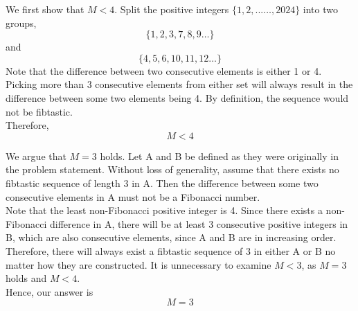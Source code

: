 \documentclass[11pt, letterpaper]{article}
\begin{document}
\begin{solution}{3}

We first show that $M < 4$. Split the positive integers $\{1,2,...\dotsc,2024\}$ into two groups, $$\{1,2,3,7,8,9\dotsc\}$$ and$$\{4,5,6,10,11,12\dotsc\}$$ Note that the difference between two consecutive elements is either 1 or 4. Picking more than 3 consecutive elements from either set will always result in the difference between some two elements being 4. By definition, the sequence would not be fibtastic.\\ Therefore, $$M < 4$$

We argue that $M = 3$ holds. Let A and B be defined as they were originally in the problem statement. Without loss of generality, assume that there exists no fibtastic sequence of length 3 in A. Then the difference between some two consecutive elements in A must not be a Fibonacci number.\\ 

Note that the least non-Fibonacci positive integer is 4. Since there exists a non-Fibonacci difference in A, there will be at least 3 consecutive positive integers in B, which are also consecutive elements, since A and B are in increasing order. Therefore, there will always exist a fibtastic sequence of 3 in either A or B no matter how they are constructed. It is unnecessary to examine $M < 3$, as $M = 3$ holds and $M < 4$.\\

Hence, our answer is $$\boxed{M = 3}$$


\end{solution}
\end{document}
